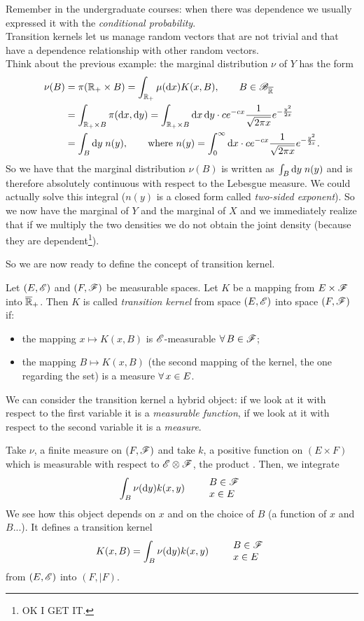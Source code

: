 \documentclass{report}
\begin{document}
Remember in the undergraduate courses: when there was dependence we usually expressed it with the \textit{conditional probability}. \\
Transition kernels let us manage random vectors that are not trivial and that have a dependence relationship with other random vectors. \\
Think about the previous example: the marginal distribution $\nu$ of $Y$ has the form \begin{align*}
	\nu(B)&=\pi(\mathbb{R}_+\times B)=\int_{\mathbb{R}_+}\mu(\mathop{}\!\mathrm{d} x)K(x,B),\qquad B\in\mathscr{B}_{\overline{\mathbb{R}}}\\
	&=\int_{\mathbb{R}_+\times B}\pi(\mathop{}\!\mathrm{d} x,\mathop{}\!\mathrm{d} y)=\int_{\mathbb{R}_+\times B}\mathop{}\!\mathrm{d} x\mathop{}\!\mathrm{d} y\cdot ce^{-cx}\frac{1}{\sqrt{2\pi x}}e^{-\frac{y^2}{2x}}\\
	&=\int_B \mathop{}\!\mathrm{d} y\; n(y),\qquad\text{where }n(y)=\int_{0}^{\infty}\mathop{}\!\mathrm{d} x \cdot ce^{-cx}\frac{1}{\sqrt{2\pi x}}e^{-\frac{y^2}{2x}}.
\end{align*}
So we have that the marginal distribution $\nu(B)$ is written as $\int_B \mathop{}\!\mathrm{d} y\;n(y)$ and is therefore absolutely continuous with respect to the Lebesgue measure. We could actually solve this integral ($n(y)$ is a closed form called \textit{two-sided exponent}). So we now have the marginal of $Y$ and the marginal of $X$ and we immediately realize that if we multiply the two densities we do not obtain the joint density (because they are dependent\footnote{OK I GET IT.}).\par
So we are now ready to define the concept of transition kernel.
\begin{definition}
	Let $(E,\mathscr{E})$ and $(F,\mathscr{F})$ be measurable spaces. Let $K$ be a mapping from $E\times\mathscr{F}$ into $\overline{\mathbb{R}}_+$. Then $K$ is called \emph{transition kernel} from space $(E,\mathscr{E})$ into space $(F,\mathscr{F})$ if:
	\begin{itemize}
		\item the mapping $x\mapsto K(x,B)$ is $\mathscr{E}$-measurable $\forall\, B\in\mathscr{F}$;
		\item the mapping $B\mapsto K(x,B)$ (the second mapping of the kernel, the one regarding the set) is a measure $\forall\, x\in E$.
	\end{itemize}
\end{definition}
We can consider the transition kernel a hybrid object: if we look at it with respect to the first variable it is a \textit{measurable function}, if we look at it with respect to the second variable it is a \textit{measure}.
\begin{example}
	Take $\nu$, a finite measure on $(F,\mathscr{F})$ and take $k$, a positive function on $(E\times F)$ which is measurable with respect to $\mathscr{E}\otimes\mathscr{F}$, the product \sa{}. Then, we integrate
	\[\int_B\nu(\mathop{}\!\mathrm{d} y)k(x,y)\qquad\begin{array}{l}
		B\in\mathscr{F}\\
		x\in E
	\end{array}\]
	We see how this object depends on $x$ and on the choice of $B$ (a function of $x$ and $B$...). It defines a transition kernel
	\[K(x,B)=\int_B\nu(\mathop{}\!\mathrm{d} y)k(x,y)\qquad\begin{array}{l}
		B\in\mathscr{F}\\
		x\in E
	\end{array}\]
	from $(E,\mathscr{E})$ into $(F,|F)$.
\end{example}
\end{document}
